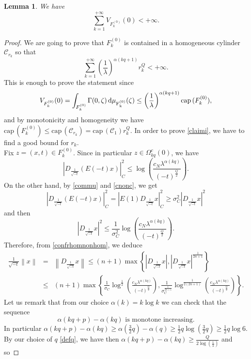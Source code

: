 \documentclass[10pt]{amsart}
\def \O {\Omega}
\def \l {\lambda}
\def \Cyl {\mathcal{C}}
\def \Ockq {\O_{kq}^c(0)}
\newtheorem{lemma}[theorem]{Lemma}
\numberwithin{equation}{section}
\begin{document}
\begin{lemma}\label{peri}
We have
$$\sum_{k=1}^{+\infty}{V_{F_k^{(0)}}(0)}<+\infty.$$
\end{lemma}
\begin{proof}
We are going to prove that $F_k^{(0)}$ is contained in a homogeneous cylinder $\Cyl_{r_k}$ so that
\begin{equation}\label{claimi}
\sum_{k=1}^{+\infty}{\left(\frac{1}{\l}\right)^{\alpha(kq+1)}r_k^Q}<+\infty.
\end{equation}
This is enough to prove the statement since
$$V_{F_k^{(0)}}(0)=\int_{F_k^{(0)}}{\Gamma(0,\zeta)\,\rm{d}\mu_{F_k^{(0)}}(\zeta)}\leq\left(\frac{1}{\l}\right)^{\alpha(kq+1)}\mathrm{cap\, } (F_k^{(0)}),$$
and by monotonicity and homogeneity we have $\mathrm{cap\, } (F_k^{(0)})\leq \mathrm{cap\, } (\Cyl_{r_k})= \mathrm{cap\, } (\Cyl_{1}) r_k^Q$. In order to prove \eqref{claimi}, we have to find a good bound for $r_k$.\\
Fix $z=(x,t)\in F_k^{(0)}$. Since in particular $z\in\Ockq$, we have
$$\left|D_{\frac{1}{\sqrt{-t}}}(E(-t)x)\right|_C^2\leq\log{\left(\frac{c_N\lambda^{\alpha(kq)}}{(-t)^{\frac{Q}{2}}}\right)}.$$
On the other hand, by \eqref{commu} and \eqref{cnonc}, we get
$$\left|D_{\frac{1}{\sqrt{-t}}}(E(-t)x)\right|_C^2=\left|E(1)D_{\frac{1}{\sqrt{-t}}}x\right|_C^2\geq\sigma^2_C \left|D_{\frac{1}{\sqrt{-t}}}x\right|^2$$
and then
\begin{equation}\label{boundM}
\left|D_{\frac{1}{\sqrt{-t}}}x\right|^2\leq\frac{1}{\sigma^2_C }\log{\left(\frac{c_N\lambda^{\alpha(kq)}}{(-t)^{\frac{Q}{2}}}\right)}.
\end{equation} 
Therefore, from \eqref{confrhomnonhom}, we deduce
\begin{eqnarray*}
\frac{1}{\sqrt{-t}}\left\|x\right\|&=&\left\|D_{\frac{1}{\sqrt{-t}}}x\right\|\leq (n+1)\max{\left\{\left|D_{\frac{1}{\sqrt{-t}}}x\right|, \left|D_{\frac{1}{\sqrt{-t}}}x\right|^{\frac{1}{2n+1}}\right\}}\\
&\leq&(n+1)\max{\left\{\frac{1}{\sigma_C}\log^{\frac{1}{2}}{\left(\frac{c_N\lambda^{\alpha(kq)}}{(-t)^{\frac{Q}{2}}}\right)}, \frac{1}{\sigma_C^{\frac{1}{2n+1}}}\log^{\frac{1}{2(2n+1)}}{\left(\frac{c_N\lambda^{\alpha(kq)}}{(-t)^{\frac{Q}{2}}}\right)}\right\}}.
\end{eqnarray*}
Let us remark that from our choice $\alpha(k)=k\log{k}$ we can check that the sequence
$$\alpha(kq+p)-\alpha(kq)\mbox{ is monotone increasing}.$$
In particular $\alpha(kq+p)-\alpha(kq)\geq\alpha(\frac{3}{2}q)-\alpha(q)\geq \frac{1}{2}q\log{(\frac{3}{2}q)}\geq\frac{1}{2}q\log{6}$. By our choice of $q$ \eqref{defq}, we have then $\alpha(kq+p)-\alpha(kq)\geq\frac{Q}{2\log{(\frac{1}{\l})}}$ and so

\end{proof}
\end{document}
